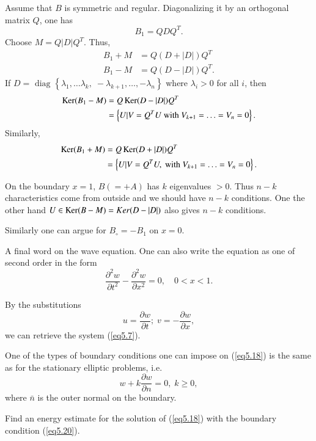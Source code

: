 Assume that $B$ is symmetric and regular. Diagonalizing it by an
orthogonal matrix $Q$, one has 
$$
B_1 = Q D Q^T.
$$
Choose $M = Q |D| Q^T$. Thus,
\begin{align*}
B_1 + M & = Q (D + |D|) Q^T\\
B_1 - M & = Q (D - |D|) Q^T.
\end{align*}
If $D = \text{ diag } \left\{ \lambda_1, \ldots \lambda_k, \; -
\lambda_{k+1} , \ldots, -\lambda_n\right\}$ where $\lambda_i > 0$ for
all $i$, then
\begin{align*}
\operatorname{Ker} (B_1 -M) & = Q \operatorname{Ker} (D-|D|) Q^T\\
& = \left\{ U|V = Q^T U \text{ with } V_{k+1} = \ldots = V_n = 0 \right\}.
\end{align*}
Similarly,
\begin{align*}
\operatorname{Ker} (B_1+M) & = Q \operatorname{Ker} (D+|D|)Q^T\\
& = \left\{ U|V = Q^T U, \text{ with } V_{k+1} = \ldots = V_n =
0\right\}. 
\end{align*}

On the boundary $x=1$, $B (=+A)$ has $k$ eigenvalues $ >0$. Thus $n-k$
characteristics come from outside and we should have $n-k$
conditions. One the other hand $U \in \operatorname{Ker} (B-M) = Ker (D-|D|)$ also
gives $n-k$ conditions.

Similarly one can argue for $B_\circ = - B_1$ on $x=0$.

A final word on the wave equation. One can also write the equation as
one of second order in the form
\begin{equation*}
\frac{\partial^2 w}{\partial t^2} - \frac{\partial^2 w}{\partial x^2}
= 0, \quad 0 < x < 1. \tag{5.18}\label{eq5.18}
\end{equation*}

By the substitutions
\begin{equation*}
u = \frac{\partial w}{\partial t}; \; v  = - \frac{\partial
  w}{\partial x}, \tag{5.19}\label{eq5.19}
\end{equation*}\pageoriginale
we can retrieve the system (\ref{eq5.7}).

One of the types of boundary conditions one can impose on (\ref{eq5.18}) is
the same as for the stationary elliptic problems, i.e.
\begin{equation*}
w + k \frac{\partial w}{\partial n} = 0, \; k \geq 0,
\tag{5.20}\label{eq5.20}
\end{equation*}
where $\bar{n}$ is the outer normal on the boundary.

\begin{exercise}\label{chap5:exer5.2}
Find an energy estimate for the solution of (\ref{eq5.18}) with the boundary
condition  (\ref{eq5.20}).
\end{exercise}

